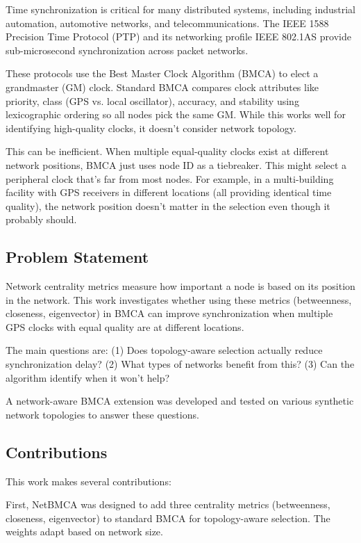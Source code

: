 \documentclass[conference]{IEEEtran}
\begin{document}
Time synchronization is critical for many distributed systems, including industrial automation, automotive networks, and telecommunications. The IEEE 1588 Precision Time Protocol (PTP) and its networking profile IEEE 802.1AS provide sub-microsecond synchronization across packet networks.

These protocols use the Best Master Clock Algorithm (BMCA) to elect a grandmaster (GM) clock. Standard BMCA compares clock attributes like priority, class (GPS vs. local oscillator), accuracy, and stability using lexicographic ordering so all nodes pick the same GM. While this works well for identifying high-quality clocks, it doesn't consider network topology.

This can be inefficient. When multiple equal-quality clocks exist at different network positions, BMCA just uses node ID as a tiebreaker. This might select a peripheral clock that's far from most nodes. For example, in a multi-building facility with GPS receivers in different locations (all providing identical time quality), the network position doesn't matter in the selection even though it probably should.

\subsection{Problem Statement}

Network centrality metrics measure how important a node is based on its position in the network. This work investigates whether using these metrics (betweenness, closeness, eigenvector) in BMCA can improve synchronization when multiple GPS clocks with equal quality are at different locations.

The main questions are: (1) Does topology-aware selection actually reduce synchronization delay? (2) What types of networks benefit from this? (3) Can the algorithm identify when it won't help?

A network-aware BMCA extension was developed and tested on various synthetic network topologies to answer these questions.

\subsection{Contributions}

This work makes several contributions:

First, NetBMCA was designed to add three centrality metrics (betweenness, closeness, eigenvector) to standard BMCA for topology-aware selection. The weights adapt based on network size.
\end{document}
